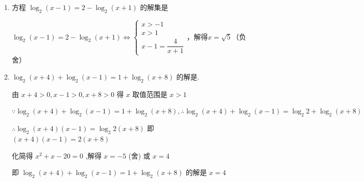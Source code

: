 \begin{enumerate}
\begin{jieda}
        解得: $x = -1$ (舍去) 或 $x = 2$
    \end{jieda}
    \item 方程 ${\log }_{2}\left( {x - 1}\right)  = 2 - {\log }_{2}\left( {x + 1}\right)$ 的解集是
    \begin{jieda}
        ${\log }_{2}\left( {x - 1}\right)  = 2 - {\log }_{2}\left( {x + 1}\right) \Longleftrightarrow \left\{\begin{array}{l}
             x > -1  \\
             x > 1 \\
             x-1 = \dfrac{4}{x+1}
        \end{array}\right.$，解得$x = \sqrt{5}$（负舍）
    \end{jieda}
    \item ${\log }_{2}\left( {x + 4}\right)  + {\log }_{2}\left( {x - 1}\right)  = 1 + {\log }_{2}\left( {x + 8}\right)$ 的解是.
    \begin{jieda}
        由 $x + 4 > 0,x - 1 > 0,x + 8 > 0$ 得 $x$ 取值范围是 $x > 1$
        
        $\because {\log }_{2}\left( {x + 4}\right)  + {\log }_{2}\left( {x - 1}\right)  = 1 + {\log }_{2}\left( {x + 8}\right) ,\therefore {\log }_{2}\left( {x + 4}\right)  + {\log }_{2}\left( {x - 1}\right)  = {\log }_{2}2 + {\log }_{2}\left( {x + 8}\right)$
        
        $\therefore {\log }_{2}\left( {x + 4}\right) \left( {x - 1}\right)  = {\log }_{2}2\left( {x + 8}\right)$ 即 $\left( {x + 4}\right) \left( {x - 1}\right)  = 2\left( {x + 8}\right)$
        
        化简得 ${x}^{2} + x - {20} = 0$ ,解得 $x =  - 5$ (舍) 或 $x = 4$
        
        即 ${\log }_{2}\left( {x + 4}\right)  + {\log }_{2}\left( {x - 1}\right)  = 1 + {\log }_{2}\left( {x + 8}\right)$ 的解是 $x = 4$
    \end{jieda}
    
\end{enumerate}
